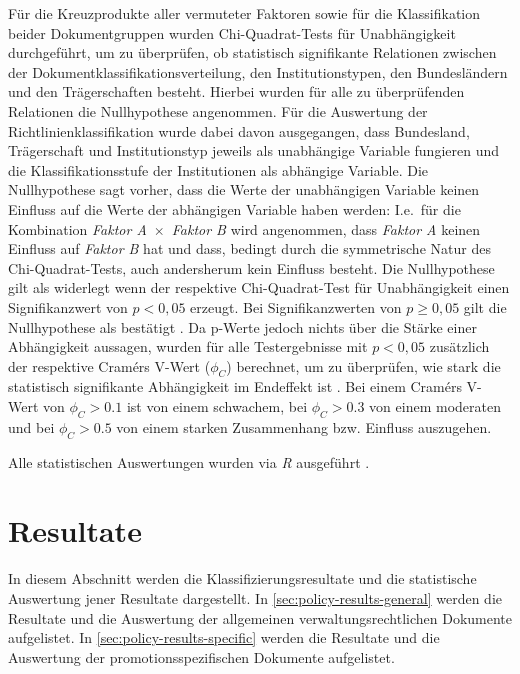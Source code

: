 Für die Kreuzprodukte aller vermuteter Faktoren sowie für die Klassifikation beider Dokumentgruppen wurden Chi-Quadrat-Tests für Unabhängigkeit durchgeführt, um zu überprüfen, ob statistisch signifikante Relationen zwischen der Dokumentklassifikationsverteilung, den Institutionstypen, den Bundesländern und den Trägerschaften besteht.
Hierbei wurden für alle zu überprüfenden Relationen die Nullhypothese angenommen.
Für die Auswertung der Richtlinienklassifikation wurde dabei davon ausgegangen, dass Bundesland, Trägerschaft und Institutionstyp jeweils als unabhängige Variable fungieren und die Klassifikationsstufe der Institutionen als abhängige Variable.
Die Nullhypothese sagt vorher, dass die Werte der unabhängigen Variable keinen Einfluss auf die Werte der abhängigen Variable haben werden:
I.e.~für die Kombination \textit{Faktor A}~$\times$~\textit{Faktor B} wird angenommen, dass \textit{Faktor A} keinen Einfluss auf \textit{Faktor B} hat und dass, bedingt durch die symmetrische Natur des Chi-Quadrat-Tests, auch andersherum kein Einfluss besteht.
Die Nullhypothese gilt als widerlegt wenn der respektive Chi-Quadrat-Test für Unabhängigkeit einen Signifikanzwert von $p<0,05$ erzeugt.
Bei Signifikanzwerten von $p\geqslant0,05$ gilt die Nullhypothese als bestätigt \autocite{Pearson1900,Pearson1904}.
Da p-Werte jedoch nichts über die Stärke einer Abhängigkeit aussagen, wurden für alle Testergebnisse mit $p<0,05$ zusätzlich der respektive Cramérs V-Wert ($\phi_C$) berechnet, um zu überprüfen, wie stark die statistisch signifikante Abhängigkeit im Endeffekt ist \autocite{Cramer1946}.
Bei einem Cramérs V-Wert von $\phi_C>\num{0,1}$ ist von einem schwachem, bei $\phi_C>\num{0,3}$ von einem moderaten und bei $\phi_C>\num{0,5}$ von einem starken Zusammenhang bzw. Einfluss auszugehen.

Alle statistischen Auswertungen wurden via \textit{R} ausgeführt \autocite{r,dplyr,my-dataset}.

\section{Resultate}\label{sec:policy-results}
In diesem Abschnitt werden die Klassifizierungsresultate und die statistische Auswertung jener Resultate dargestellt.
In \cref{sec:policy-results-general} werden die Resultate und die Auswertung der allgemeinen verwaltungsrechtlichen Dokumente aufgelistet.
In \cref{sec:policy-results-specific} werden die Resultate und die Auswertung der promotionsspezifischen Dokumente aufgelistet.

